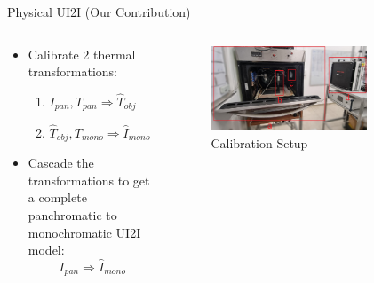 \begin{frame}{Physical UI2I (Our Contribution)}
  \begin{columns}   
    \begin{column}{0.5\textwidth}
      \begin{itemize} 
        \item Calibrate 2 thermal transformations:
        \begin{enumerate}
          \item $I_\mathit{pan}, T_\mathit{pan} \Rightarrow \hat{T}_\mathit{obj}$ \vspace{0.15cm}
          \item $\hat{T}_\mathit{obj}, T_\mathit{mono} \Rightarrow \hat{I}_\mathit{mono}$\vspace{0.25cm}
        \end{enumerate}
        \item Cascade the transformations to get a complete panchromatic to monochromatic UI2I model: 
        \begin{equation*}
          I_\mathit{pan} \Rightarrow \hat{I}_\mathit{mono} 
        \end{equation*}
      \end{itemize}
    \end{column} 
    \begin{column}{0.5\textwidth}
      \begin{figure}            
        \centering\includegraphics[width=0.75\textwidth]{../figs/methods/calib_setup.jpg}
        \caption*{Calibration Setup}
      \end{figure}      
      
    \end{column} 
  \end{columns}
\end{frame}

